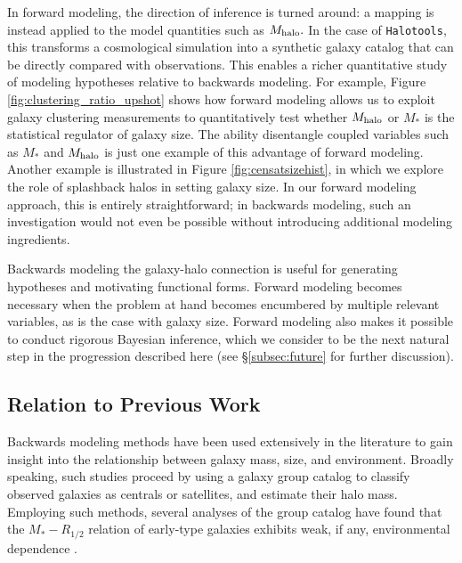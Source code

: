 \documentclass[usenatbib,usegraphicx,letterpaper]{mn2e}
\newcommand{\rhalf}{R_{1/2}}
\newcommand{\mstar}{M_{\ast}}
\newcommand{\mhalo}{M_{\rm halo}}
\begin{document}
In forward modeling, the direction of inference is turned around: a mapping is instead applied to the model quantities such as $\mhalo.$ In the case of {\tt Halotools}, this transforms a cosmological simulation into a synthetic galaxy catalog that can be directly compared with observations. This enables a richer quantitative study of modeling hypotheses relative to backwards modeling. For example, Figure \ref{fig:clustering_ratio_upshot} shows how forward modeling allows us to exploit galaxy clustering measurements to quantitatively test whether $\mhalo$ or $\mstar$ is the statistical regulator of galaxy size. The ability disentangle coupled variables such as $\mstar$ and $\mhalo$ is just one example of this advantage of forward modeling. Another example is illustrated in Figure \ref{fig:censatsizehist}, in which we explore the role of splashback halos in setting galaxy size. In our forward modeling approach, this is entirely straightforward; in backwards modeling, such an investigation would not even be possible without introducing additional modeling ingredients.

Backwards modeling the galaxy-halo connection is useful for generating hypotheses and motivating functional forms. Forward modeling becomes necessary when the problem at hand becomes encumbered by multiple relevant variables, as is the case with galaxy size. Forward modeling also makes it possible to conduct rigorous Bayesian inference, which we consider to be the next natural step in the progression described here (see \S\ref{subsec:future} for further discussion).

\subsection{Relation to Previous Work}
\label{subsec:previous_work}

Backwards modeling methods have been used extensively in the literature to gain insight into the relationship between galaxy mass, size, and environment. Broadly speaking, such studies proceed by using a galaxy group catalog to classify observed galaxies as centrals or satellites, and estimate their halo mass.  Employing such methods, several analyses of the \citet{yang_etal05b} group catalog have found that the $\mstar-\rhalf$ relation of early-type galaxies exhibits weak, if any, environmental dependence \citep{huertas_company_etal13b,shankar_etal14}. 
\end{document}
